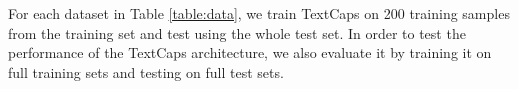 %
%
%
%
For each dataset in Table \ref{table:data}, we train TextCaps on 200 training samples from the training set and test using the whole test set. In order to test the performance of the TextCaps architecture, we also evaluate it by training it on full training sets and testing on full test sets.

